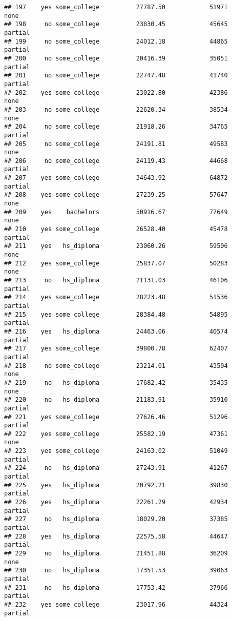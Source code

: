 \documentclass[
]{article}
\begin{document}
\begin{verbatim}
## 197    yes some_college          27787.50            51971        none
## 198     no some_college          23830.45            45645     partial
## 199     no some_college          24012.18            44865     partial
## 200     no some_college          20416.39            35051     partial
## 201     no some_college          22747.48            41740     partial
## 202    yes some_college          23022.80            42386        none
## 203     no some_college          22620.34            38534        none
## 204     no some_college          21918.26            34765     partial
## 205     no some_college          24191.81            49583        none
## 206     no some_college          24119.43            44668     partial
## 207    yes some_college          34643.92            64872     partial
## 208    yes some_college          27239.25            57647        none
## 209    yes    bachelors          50916.67            77649        none
## 210    yes some_college          26528.40            45478     partial
## 211    yes   hs_diploma          23060.26            59506        none
## 212    yes some_college          25837.07            50283        none
## 213     no   hs_diploma          21131.03            46106     partial
## 214    yes some_college          28223.48            51536     partial
## 215    yes some_college          28384.48            54895     partial
## 216    yes   hs_diploma          24463.06            40574     partial
## 217    yes some_college          39800.78            62407     partial
## 218     no some_college          23214.01            43504        none
## 219     no   hs_diploma          17682.42            35435        none
## 220     no   hs_diploma          21183.91            35910     partial
## 221    yes some_college          27626.46            51296     partial
## 222    yes some_college          25582.19            47361        none
## 223    yes some_college          24163.02            51049     partial
## 224     no   hs_diploma          27243.91            41267     partial
## 225    yes   hs_diploma          20792.21            39830     partial
## 226    yes   hs_diploma          22261.29            42934     partial
## 227     no   hs_diploma          18029.20            37385     partial
## 228    yes   hs_diploma          22575.58            44647     partial
## 229     no   hs_diploma          21451.88            36209        none
## 230     no   hs_diploma          17351.53            39063     partial
## 231     no   hs_diploma          17753.42            37966     partial
## 232    yes some_college          23017.96            44324     partial

\end{verbatim}
\end{document}

